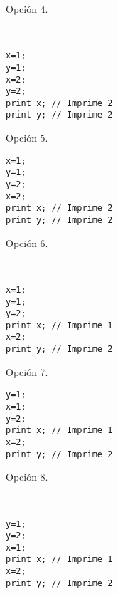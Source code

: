 \begin{ejercicio}
\begin{enumerate}
\begin{figure}
\begin{subfigure}{0.3\textwidth}
        \caption{Opción 4.}            
    \end{subfigure}
    \\
    \begin{subfigure}{0.3\textwidth}
        \begin{verbatim}
x=1;
y=1;
x=2;
y=2;
print x; // Imprime 2
print y; // Imprime 2
        \end{verbatim}
        \caption{Opción 5.}
    \end{subfigure}\hspace{3cm}
    \begin{subfigure}{0.3\textwidth}
        \begin{verbatim}
x=1;
y=1;
y=2;
x=2;
print x; // Imprime 2
print y; // Imprime 2
        \end{verbatim}
        \caption{Opción 6.}            
    \end{subfigure}
    \\
    \begin{subfigure}{0.3\textwidth}
        \begin{verbatim}
x=1;
y=1;
y=2;
print x; // Imprime 1
x=2;
print y; // Imprime 2
        \end{verbatim}
        \caption{Opción 7.}
    \end{subfigure}\hspace{3cm}
    \begin{subfigure}{0.3\textwidth}
        \begin{verbatim}
y=1;
x=1;
y=2;
print x; // Imprime 1
x=2;
print y; // Imprime 2
        \end{verbatim}
        \caption{Opción 8.}            
    \end{subfigure}
    \\
    \begin{subfigure}{0.3\textwidth}
        \begin{verbatim}
y=1;
y=2;
x=1;
print x; // Imprime 1
x=2;
print y; // Imprime 2

\end{verbatim}
\end{subfigure}
\end{figure}
\end{enumerate}
\end{ejercicio}
